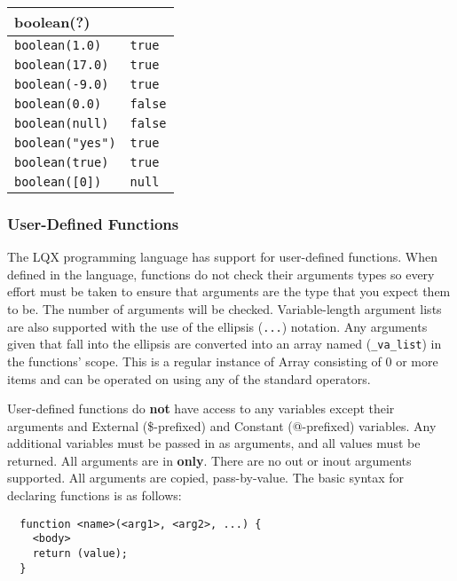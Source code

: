\begin{multicols}{2}
  \begin{center}
    \begin{tabular}{|p{1.7in}|p{1.0in}|}
      \hline
      \multicolumn{2}{|l|}{\textbf{boolean(?)}}\\
      \hline
      {\tt boolean(1.0)} & {\tt true}\\
      {\tt boolean(17.0)} & {\tt true}\\
      {\tt boolean(-9.0)} & {\tt true}\\
      {\tt boolean(0.0)} & {\tt false}\\
      {\tt boolean(null)}& {\tt false}\\
      {\tt boolean("yes")}&{\tt true}\\
      {\tt boolean(true)}& {\tt true}\\
      {\tt boolean([0])} & {\tt null}\\
      \hline
    \end{tabular}
  \end{center}
\end{multicols}

\subsubsection{User-Defined Functions}

The LQX programming language has support for user-defined functions. When
defined in the language, functions do not check their arguments types so every
effort must be taken to ensure that arguments are the type that you expect them
to be. The number of arguments will be checked. Variable-length 
argument lists are also supported with the use of the
ellipsis ({\tt ...}) notation. Any arguments given that fall into the ellipsis
are converted into an array named ({\tt \_va\_list}) in the functions' scope.
This is a regular instance of Array consisting of 0 or more items and can be
operated on using any of the standard operators.

User-defined functions do \textbf{not} have access to any variables except
their arguments and External (\$-prefixed) and Constant (@-prefixed) variables.
Any additional variables must be passed in as arguments, and all values must
be returned. All arguments are in \textbf{only}. There are no out or inout
arguments supported. All arguments are copied, pass-by-value. The basic syntax 
for declaring functions is as follows:

\lstset{language=LQX}
\begin{lstlisting}  
  function <name>(<arg1>, <arg2>, ...) {
    <body>
    return (value);
  }
\end{lstlisting}

